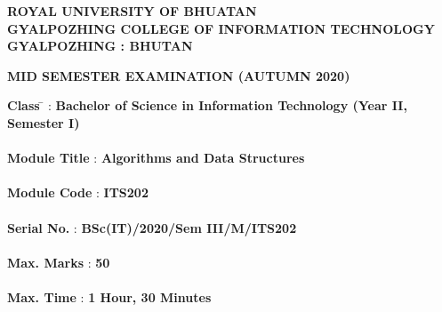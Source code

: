 \documentclass[12pt ,a4paper]{exam}
\author{Yonten Jamtsho}
\begin{document}
	\begin{center}
		\textbf{ROYAL UNIVERSITY OF BHUATAN} \\
		\textbf{GYALPOZHING COLLEGE OF INFORMATION TECHNOLOGY} \\
		\textbf{GYALPOZHING : BHUTAN}
	\end{center}
	
	\vspace{0.2cm}
	
	\begin{center}
		\textbf{MID SEMESTER EXAMINATION (AUTUMN 2020)}
	\end{center}
	
	\vspace{0.1cm}
	
	\begin{tabbing}
		\textbf{Class} \=  \hspace{2cm} :  \hspace{0.3cm} \textbf{Bachelor of Science in Information Technology (Year II, Semester I)}     \\ \\
		
		\textbf{Module Title} \hspace{0.65cm} : \hspace{0.3cm} \textbf{Algorithms and Data Structures}       \\ \\
		
		\textbf{Module Code} \hspace{0.55cm} :     \hspace{0.3cm} \textbf{ITS202}     \\ \\
		
		\textbf{Serial No.} \hspace{1.13cm} :       \hspace{0.3cm} \textbf{BSc(IT)/2020/Sem III/M/ITS202}          \\ \\
		
		\textbf{Max. Marks} \hspace{0.75cm} :     \hspace{0.3cm} \textbf{50}             \\ \\
		
		\textbf{Max. Time} \hspace{1.04cm} :        \hspace{0.3cm} \textbf{1 Hour, 30 Minutes}             \\ \\
	\end{tabbing}
	
\end{document}
